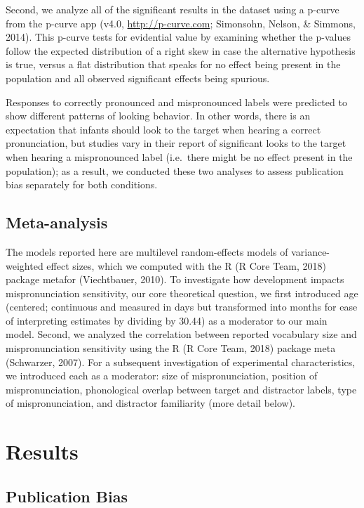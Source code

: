 \documentclass[man]{apa6}
\begin{document}
Second, we analyze all of the significant results in the dataset using a p-curve from the p-curve app (v4.0, \url{http://p-curve.com}; Simonsohn, Nelson, \& Simmons, 2014). This p-curve tests for evidential value by examining whether the p-values follow the expected distribution of a right skew in case the alternative hypothesis is true, versus a flat distribution that speaks for no effect being present in the population and all observed significant effects being spurious.

Responses to correctly pronounced and mispronounced labels were predicted to show different patterns of looking behavior. In other words, there is an expectation that infants should look to the target when hearing a correct pronunciation, but studies vary in their report of significant looks to the target when hearing a mispronounced label (i.e.~there might be no effect present in the population); as a result, we conducted these two analyses to assess publication bias separately for both conditions.

\hypertarget{meta-analysis}{%
\subsection{Meta-analysis}\label{meta-analysis}}

The models reported here are multilevel random-effects models of variance-weighted effect sizes, which we computed with the R (R Core Team, 2018) package metafor (Viechtbauer, 2010). To investigate how development impacts mispronunciation sensitivity, our core theoretical question, we first introduced age (centered; continuous and measured in days but transformed into months for ease of interpreting estimates by dividing by 30.44) as a moderator to our main model. Second, we analyzed the correlation between reported vocabulary size and mispronunciation sensitivity using the R (R Core Team, 2018) package meta (Schwarzer, 2007). For a subsequent investigation of experimental characteristics, we introduced each as a moderator: size of mispronunciation, position of mispronunciation, phonological overlap between target and distractor labels, type of mispronunciation, and distractor familiarity (more detail below).

\hypertarget{results}{%
\section{Results}\label{results}}

\hypertarget{publication-bias-1}{%
\subsection{Publication Bias}\label{publication-bias-1}}
\end{document}
